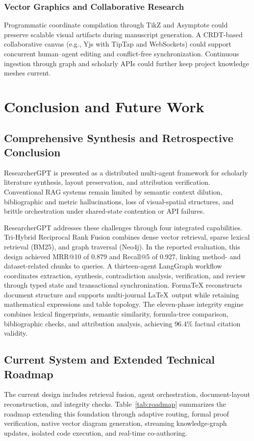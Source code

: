 \documentclass[conference]{IEEEtran}
\begin{document}
\subsubsection{Vector Graphics and Collaborative Research}
Programmatic coordinate compilation through TikZ and Asymptote could preserve scalable visual artifacts during manuscript generation. A CRDT-based collaborative canvas (e.g., Yjs with TipTap and WebSockets) could support concurrent human--agent editing and conflict-free synchronization. Continuous ingestion through graph and scholarly APIs could further keep project knowledge meshes current.

\section{Conclusion and Future Work}
\subsection{Comprehensive Synthesis and Retrospective Conclusion}
ResearcherGPT is presented as a distributed multi-agent framework for scholarly literature synthesis, layout preservation, and attribution verification. Conventional RAG systems remain limited by semantic context dilution, bibliographic and metric hallucinations, loss of visual-spatial structures, and brittle orchestration under shared-state contention or API failures.

ResearcherGPT addresses these challenges through four integrated capabilities. Tri-Hybrid Reciprocal Rank Fusion combines dense vector retrieval, sparse lexical retrieval (BM25), and graph traversal (Neo4j). In the reported evaluation, this design achieved MRR@10 of 0.879 and Recall@5 of 0.927, linking method- and dataset-related chunks to queries. A thirteen-agent LangGraph workflow coordinates extraction, synthesis, contradiction analysis, verification, and review through typed state and transactional synchronization. FormaTeX reconstructs document structure and supports multi-journal \LaTeX\ output while retaining mathematical expressions and table topology. The eleven-phase integrity engine combines lexical fingerprints, semantic similarity, formula-tree comparison, bibliographic checks, and attribution analysis, achieving 96.4\% factual citation validity.


\subsection{Current System and Extended Technical Roadmap}
The current design includes retrieval fusion, agent orchestration, document-layout reconstruction, and integrity checks. Table~\ref{tab:roadmap} summarizes the roadmap extending this foundation through adaptive routing, formal proof verification, native vector diagram generation, streaming knowledge-graph updates, isolated code execution, and real-time co-authoring.
\end{document}
